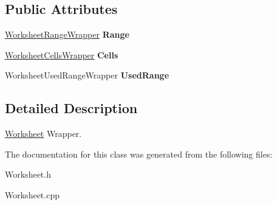 \subsection*{Public Attributes}
\begin{DoxyCompactItemize}
\item 
\hypertarget{class_excel_application_wrapper_1_1_worksheet_a8d9d1ac7df2930d190baaa52e44767bc}{}\hyperlink{class_excel_application_wrapper_1_1_worksheet_range_wrapper}{Worksheet\+Range\+Wrapper} {\bfseries Range}\label{class_excel_application_wrapper_1_1_worksheet_a8d9d1ac7df2930d190baaa52e44767bc}

\item 
\hypertarget{class_excel_application_wrapper_1_1_worksheet_a186ce7cc33c79fb9bf36540a4757ddec}{}\hyperlink{class_excel_application_wrapper_1_1_worksheet_cells_wrapper}{Worksheet\+Cells\+Wrapper} {\bfseries Cells}\label{class_excel_application_wrapper_1_1_worksheet_a186ce7cc33c79fb9bf36540a4757ddec}

\item 
\hypertarget{class_excel_application_wrapper_1_1_worksheet_ae4421358a32391f8d6812fb2c75fdb76}{}Worksheet\+Used\+Range\+Wrapper {\bfseries Used\+Range}\label{class_excel_application_wrapper_1_1_worksheet_ae4421358a32391f8d6812fb2c75fdb76}

\end{DoxyCompactItemize}


\subsection{Detailed Description}
\hyperlink{class_excel_application_wrapper_1_1_worksheet}{Worksheet} Wrapper. 

The documentation for this class was generated from the following files\+:\begin{DoxyCompactItemize}
\item 
Worksheet.\+h\item 
Worksheet.\+cpp\end{DoxyCompactItemize}
